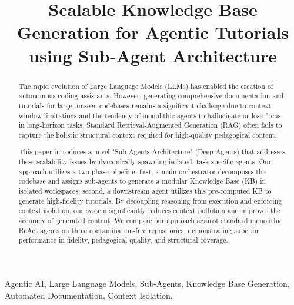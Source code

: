 \documentclass[conference]{IEEEtran}
\begin{document}
\title{Scalable Knowledge Base Generation for Agentic Tutorials using Sub-Agent Architecture}

\author{
\and
{}
}

\maketitle

\begin{abstract}
The rapid evolution of Large Language Models (LLMs) has enabled the creation of autonomous coding assistants. However, generating comprehensive documentation and tutorials for large, unseen codebases remains a significant challenge due to context window limitations and the tendency of monolithic agents to hallucinate or lose focus in long-horizon tasks. Standard Retrieval-Augmented Generation (RAG) often fails to capture the holistic structural context required for high-quality pedagogical content. 

This paper introduces a novel "Sub-Agents Architecture" (Deep Agents) that addresses these scalability issues by dynamically spawning isolated, task-specific agents. Our approach utilizes a two-phase pipeline: first, a main orchestrator decomposes the codebase and assigns sub-agents to generate a modular Knowledge Base (KB) in isolated workspaces; second, a downstream agent utilizes this pre-computed KB to generate high-fidelity tutorials. By decoupling reasoning from execution and enforcing context isolation, our system significantly reduces context pollution and improves the accuracy of generated content. We compare our approach against standard monolithic ReAct agents on three contamination-free repositories, demonstrating superior performance in fidelity, pedagogical quality, and structural coverage.
\end{abstract}

\begin{IEEEkeywords}
Agentic AI, Large Language Models, Sub-Agents, Knowledge Base Generation, Automated Documentation, Context Isolation.
\end{IEEEkeywords}
\end{document}
